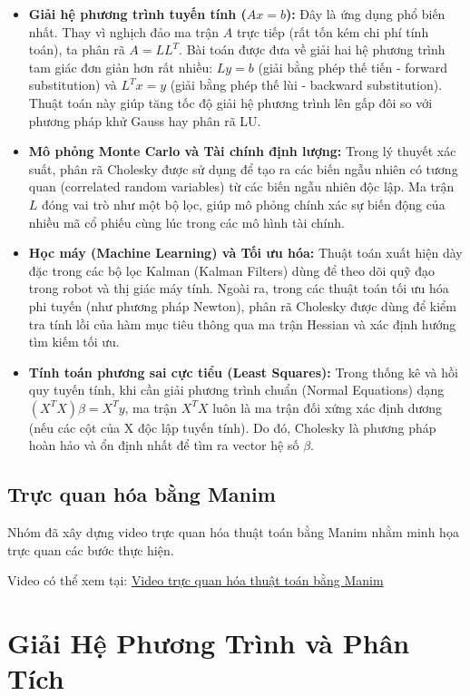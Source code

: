\documentclass[a4paper,12pt]{report}
\begin{document}
\begin{itemize}
  \item \textbf{Giải hệ phương trình tuyến tính ($Ax = b$):} Đây là ứng dụng phổ biến nhất. Thay vì nghịch đảo ma trận $A$ trực tiếp (rất tốn kém chi phí tính toán), ta phân rã $A = LL^T$. Bài toán được đưa về giải hai hệ phương trình tam giác đơn giản hơn rất nhiều: $Ly = b$ (giải bằng phép thế tiến - forward substitution) và $L^T x = y$ (giải bằng phép thế lùi - backward substitution). Thuật toán này giúp tăng tốc độ giải hệ phương trình lên gấp đôi so với phương pháp khử Gauss hay phân rã LU.

  \item \textbf{Mô phỏng Monte Carlo và Tài chính định lượng:} Trong lý thuyết xác suất, phân rã Cholesky được sử dụng để tạo ra các biến ngẫu nhiên có tương quan (correlated random variables) từ các biến ngẫu nhiên độc lập. Ma trận $L$ đóng vai trò như một bộ lọc, giúp mô phỏng chính xác sự biến động của nhiều mã cổ phiếu cùng lúc trong các mô hình tài chính.

  \item \textbf{Học máy (Machine Learning) và Tối ưu hóa:} Thuật toán xuất hiện dày đặc trong các bộ lọc Kalman (Kalman Filters) dùng để theo dõi quỹ đạo trong robot và thị giác máy tính. Ngoài ra, trong các thuật toán tối ưu hóa phi tuyến (như phương pháp Newton), phân rã Cholesky được dùng để kiểm tra tính lồi của hàm mục tiêu thông qua ma trận Hessian và xác định hướng tìm kiếm tối ưu.

  \item \textbf{Tính toán phương sai cực tiểu (Least Squares):} Trong thống kê và hồi quy tuyến tính, khi cần giải phương trình chuẩn (Normal Equations) dạng $(X^T X) \beta = X^T y$, ma trận $X^T X$ luôn là ma trận đối xứng xác định dương (nếu các cột của X độc lập tuyến tính). Do đó, Cholesky là phương pháp hoàn hảo và ổn định nhất để tìm ra vector hệ số $\beta$.
\end{itemize}

\section{Trực quan hóa bằng Manim}
Nhóm đã xây dựng video trực quan hóa thuật toán bằng Manim nhằm minh họa trực quan các bước thực hiện.

Video có thể xem tại: 
\href{https://www.youtube.com/watch?v=_k884LpVcJM}{Video trực quan hóa thuật toán bằng Manim}

\chapter[Giải Hệ Phương Trình và Phân Tích Hiệu Năng]{Giải Hệ Phương Trình và Phân Tích \\ \hspace*{4em}{Hiệu Năng}}
\end{document}
